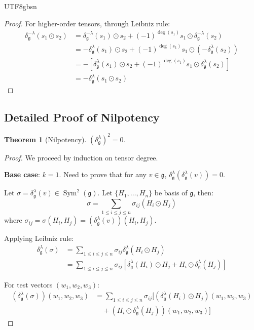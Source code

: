\documentclass[a4paper,12pt]{extarticle}
\newtheorem{theorem}{Theorem}[section]
\theoremstyle{definition}
\begin{document}
\begin{CJK}{UTF8}{gbsn}
\begin{proof}
For higher-order tensors, through Leibniz rule:
\begin{align}
\delta^{-\lambda}_\mathfrak{g}(s_1 \odot s_2) &= \delta^{-\lambda}_\mathfrak{g}(s_1) \odot s_2 + (-1)^{\deg(s_1)} s_1 \odot \delta^{-\lambda}_\mathfrak{g}(s_2) \\
&= -\delta^\lambda_\mathfrak{g}(s_1) \odot s_2 + (-1)^{\deg(s_1)} s_1 \odot (-\delta^\lambda_\mathfrak{g}(s_2)) \\
&= -[\delta^\lambda_\mathfrak{g}(s_1) \odot s_2 + (-1)^{\deg(s_1)} s_1 \odot \delta^\lambda_\mathfrak{g}(s_2)] \\
&= -\delta^\lambda_\mathfrak{g}(s_1 \odot s_2)
\end{align}
\end{proof}

\subsection{Detailed Proof of Nilpotency}
\label{subsec:nilpotency_detailed_proof}

\begin{theorem}[Nilpotency]
\label{thm:nilpotency}
$(\delta^\lambda_\mathfrak{g})^2 = 0$.
\end{theorem}

\begin{proof}
We proceed by induction on tensor degree.

\textbf{Base case}: $k=1$. Need to prove that for any $v \in \mathfrak{g}$, $\delta^\lambda_\mathfrak{g}(\delta^\lambda_\mathfrak{g}(v)) = 0$.

Let $\sigma = \delta^\lambda_\mathfrak{g}(v) \in \operatorname{Sym}^2(\mathfrak{g})$. Let $\{H_1, \ldots, H_n\}$ be basis of $\mathfrak{g}$, then:
$$\sigma = \sum_{1 \leq i \leq j \leq n} \sigma_{ij} (H_i \odot H_j)$$
where $\sigma_{ij} = \sigma(H_i, H_j) = (\delta^\lambda_\mathfrak{g}(v))(H_i, H_j)$.

Applying Leibniz rule:
\begin{align}
\delta^\lambda_\mathfrak{g}(\sigma) &= \sum_{1 \leq i \leq j \leq n} \sigma_{ij} \delta^\lambda_\mathfrak{g}(H_i \odot H_j) \\
&= \sum_{1 \leq i \leq j \leq n} \sigma_{ij} [\delta^\lambda_\mathfrak{g}(H_i) \odot H_j + H_i \odot \delta^\lambda_\mathfrak{g}(H_j)]
\end{align}

For test vectors $(w_1, w_2, w_3)$:
\begin{align}
(\delta^\lambda_\mathfrak{g}(\sigma))(w_1, w_2, w_3) &= \sum_{1 \leq i \leq j \leq n} \sigma_{ij} [(\delta^\lambda_\mathfrak{g}(H_i) \odot H_j)(w_1, w_2, w_3) \\
&\quad + (H_i \odot \delta^\lambda_\mathfrak{g}(H_j))(w_1, w_2, w_3)]
\end{align}


\end{proof}
\end{CJK}
\end{document}
